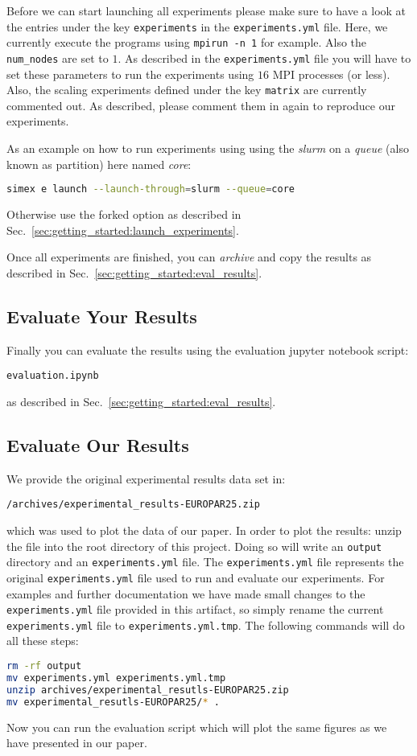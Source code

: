 \documentclass[11pt, a4paper]{scrartcl}
\newcommand{\expfile}{\texttt{experiments.yml} file\xspace}
\begin{document}
Before we can start launching all experiments please make sure to have a look at
the entries under the key \texttt{experiments} in the \expfile. Here, we
currently execute the programs using \texttt{mpirun -n 1} for example. Also the
\texttt{num\_nodes} are set to $1$. As described in the \expfile you will have to
set these parameters to run the experiments using $16$ MPI processes (or less).
Also, the scaling experiments defined under the key \texttt{matrix} are
currently commented out. As described, please comment them in again to reproduce
our experiments.

As an example on how to run experiments using using the \emph{slurm} on a
\emph{queue} (also known as partition) here named \emph{core}:

\begin{lstlisting}[language=bash]
simex e launch --launch-through=slurm --queue=core
\end{lstlisting}

Otherwise use the forked option as described in
Sec.~\ref{sec:getting_started:launch_experiments}.

Once all experiments are finished, you can \emph{archive} and copy the results
as described in Sec.~\ref{sec:getting_started:eval_results}.

\subsection{Evaluate Your Results}

Finally you can evaluate the results using the evaluation jupyter notebook
script:

\texttt{evaluation.ipynb}

\noindent as described in Sec.~\ref{sec:getting_started:eval_results}.

\subsection{Evaluate Our Results}

We provide the original experimental results data set in:

\texttt{/archives/experimental\_results-EUROPAR25.zip}

\noindent which was used to plot the data of our paper. In order to plot the results:
unzip the file into the root directory of this project. Doing so will write an
\texttt{output} directory and an \texttt{experiments.yml} file. The
\texttt{experiments.yml} file represents the original \texttt{experiments.yml}
file used to run and evaluate our experiments. For examples and further
documentation we have made small changes to the \expfile provided in this
artifact, so simply rename the current \expfile to \texttt{experiments.yml.tmp}.
The following commands will do all these steps:

\begin{lstlisting}[language=bash]
rm -rf output
mv experiments.yml experiments.yml.tmp
unzip archives/experimental_resutls-EUROPAR25.zip
mv experimental_resutls-EUROPAR25/* .
\end{lstlisting}

Now you can run the evaluation script which will plot the same figures as we
have presented in our paper.
\end{document}
